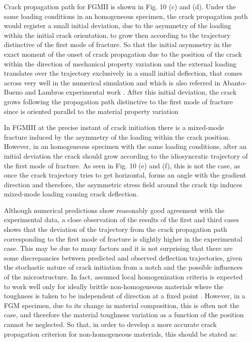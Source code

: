 Crack propagation path for FGMII is shown in Fig. 10 (c) and (d). Under the same loading conditions in an homogeneous specimen, the crack propagation path would register a small initial deviation, due to the asymmetry of the loading within the initial crack orientation, to grow then according to the trajectory distinctive of the first mode of fracture. So that the initial asymmetry in the exact moment of the onset of crack propagation due to the position of the crack within the direction of mechanical property variation and the external loading translates over the trajectory exclusively in a small initial deflection, that comes across very well in the numerical simulation and which is also referred in Abanto-Bueno and Lambros experimental work \citep{Abanto-Bueno2006}. After this initial deviation, the crack grows following the propagation path distinctive to the first mode of fracture since is oriented parallel to the material property variation
 
In FGMIII at the precise instant of crack initiation there is a mixed-mode fracture induced by the asymmetry of the loading within the crack position. However, in an homogeneous specimen with the same loading conditions, after an initial deviation the crack should grow according to the idiosyncratic trajectory of the first mode of fracture. As seen in Fig. 10 (e) and (f), this is not the case, as once the crack trajectory tries to get horizontal, forms an angle with the gradient direction and therefore, the asymmetric stress field around the crack tip induces mixed-mode loading causing crack deflection.
 
Although numerical predictions show reasonably good agreement with the experimental data, a close observation of the results of the first and third cases shows that the deviation of the trajectory from the crack propagation path corresponding to the first mode of fracture is slightly higher in the experimental case. This may be due to many factors and it is not surprising that there are some discrepancies between predicted and observed deflection trajectories, given the stochastic nature of crack initiation from a notch and the possible influences of the microstructure. In fact, assumed local homogenization criteria is expected to work well only for ideally brittle non-homogeneous materials where the toughness is taken to be independent of direction at a fixed point \citep{Gu1997b}. However, in a FGM specimen, due to its change in material composition, this is often not the case, and therefore the material toughness variation as a function of the position cannot be neglected. So that, in order to develop a more accurate crack propagation criterion for non-homogeneous materials, this should be stated as:

